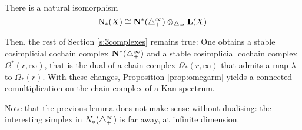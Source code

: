 \begin{lemma}
    There is a natural isomorphism
\[
    \operatorname{N}_*(X)\cong \mathbf{N}^*(\triangle_{+}^{\infty})\otimes_{\triangle_{st}} \operatorname{\mathbf{L}}(X)
\]
\end{lemma}

Then, the rest of Section \ref{s:3complexes} remains true: One obtains a stable cosimplicial cochain complex $\mathbf{N}^*(\triangle_{+}^\infty)$ and a stable cosimplicial cochain complex $\Omega^*(r,\infty)$, that is the dual of a chain complex $\Omega_*(r,\infty)$ that admits a map $\lambda$ to $\Omega_*(r)$. With these changes, Proposition \ref{prop:omegarm} yields a connected comultiplication on the chain complex of a Kan spectrum. 

Note that the previous lemma does not make sense without dualising: the interesting simplex in $N_*(\triangle_{+}^\infty)$ is far away, at infinite dimension.


